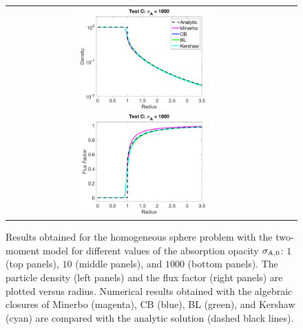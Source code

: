 \begin{figure}[H]
\begin{tabular}{cc}
    \includegraphics[width=0.5\textwidth]{figures/HomogeneousSphere_ClosureComparison_Chi_1e3_Density}
    \includegraphics[width=0.5\textwidth]{figures/HomogeneousSphere_ClosureComparison_Chi_1e3_FluxFactor}
  \end{tabular}
   \caption{Results obtained for the homogeneous sphere problem with the two-moment model for different values of the absorption opacity $\sigma_{{\rm A},0}$: $1$ (top panels), $10$ (middle panels), and $1000$ (bottom panels).  The particle density (left panels) and the flux factor (right panels) are plotted versus radius.  Numerical results obtained with the algebraic closures of Minerbo (magenta), CB (blue), BL (green), and Kershaw (cyan) are compared with the analytic solution (dashed black lines).}
  \label{fig:HomogeneousSphere}
\end{figure}

